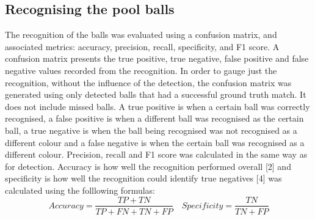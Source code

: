\documentclass[12pt]{article}
\begin{document}
\subsection{Recognising the pool balls}
The recognition of the balls was evaluated using a confusion matrix, and associated metrics: accuracy, precision, recall, specificity, and F1 score. A confusion matrix presents the true positive, true negative, false positive and false negative values recorded from the recognition. In order to gauge just the recognition, without the influence of the detection, the confusion matrix was generated using only detected balls that had a successful ground truth match. It does not include missed balls. A true positive is when a certain ball was correctly recognised, a false positive is when a different ball was recognised as the certain ball, a true negative is when the ball being recognised was not recognised as a different colour  and a false negative is when the certain ball was recognised as a different colour. Precision, recall and F1 score was calculated in the same way as for detection. Accuracy is how well the recognition performed overall [2] and specificity is  how well the recognition could identify true negatives [4] was calculated using the folllowing formulas:
\[
Accuracy = \frac{TP+TN}{TP + FN + TN + FP}
\quad
Specificity  = \frac{TN}{TN + FP}
\]
\end{document}

